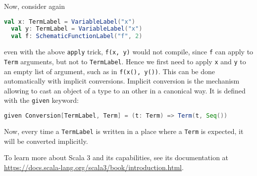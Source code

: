 Now, consider again
\begin{lstlisting}[language=Scala]
  val x: TermLabel = VariableLabel("x")
  val y: TermLabel = VariableLabel("x")
  val f: SchematicFunctionLabel("f", 2)
\end{lstlisting}
even with the above \lstinline|apply| trick, \lstinline|f(x, y)| would not compile, since \lstinline|f| can apply to \lstinline|Term| arguments, but not to \lstinline|TermLabel|. Hence we first need to apply \lstinline|x| and \lstinline|y| to an empty list of argument, such as in \lstinline|f(x(), y())|.
This can be done automatically with implicit conversions. Implicit conversion is the mechanism allowing to cast an object of a type to an other in a canonical way. It is defined with the \lstinline|given| keyword:
%
\begin{lstlisting}[language=Scala]
  given Conversion[TermLabel, Term] = (t: Term) => Term(t, Seq())
\end{lstlisting}
%
Now, every time a \lstinline|TermLabel| is written in a place where a \lstinline|Term| is expected, it will be converted implicitly.

To learn more about Scala 3 and its capabilities, see its documentation at {\footnotesize\url{https://docs.scala-lang.org/scala3/book/introduction.html}}.
